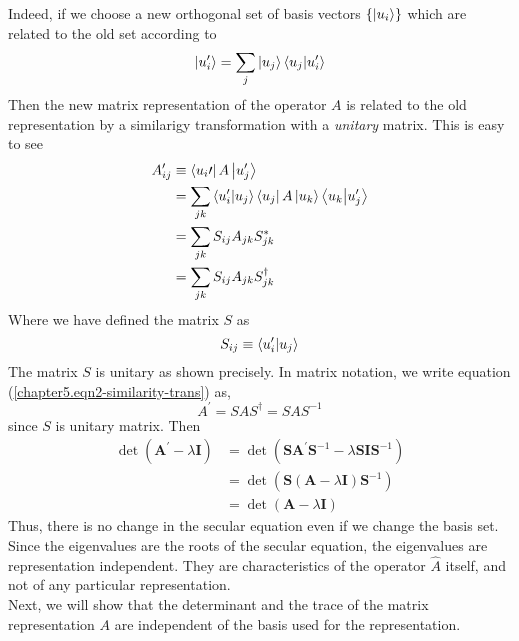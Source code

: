 	Indeed, if we choose a new orthogonal set of basis vectors $\{\ket{u_i}\}$ which are related to the old set according to 
	\begin{equation}
		\ket{u_i^\prime} = \sum_j \ket{u_j}\braket{u_j}{u_i^\prime}
	\end{equation}
	Then the new matrix representation of the operator $A$ is related to the old representation by a similarigy transformation with a \textit{unitary} matrix. This is easy to see
	\begin{eqnarray}
		A_{ij}^\prime 
		&\equiv \bra{u_i\prime} A \ket{u_j^\prime} \nonumber\\
		&= \sum_{jk} \braket{u_i^\prime}{u_j}\bra{u_j}A\ket{u_k}\braket{u_k}{u_j^\prime} \nonumber\\
		&= \sum_{jk} S_{ij} A_{jk} S_{jk}^* \nonumber\\
		&= \sum_{jk} S_{ij} A_{jk} S_{jk}^\dagger
		\label{chapter5.eqn2-similarity-trans}
	\end{eqnarray}
	Where we have defined the matrix $S$ as
	\begin{equation}
		S_{ij} \equiv \braket{u_i^\prime}{u_j}
	\end{equation}
	The matrix $S$ is unitary as shown precisely. In matrix notation, we write equation (\ref{chapter5.eqn2-similarity-trans}) as,
	\begin{equation}
		A^\prime = S A S^\dagger = S A S^{-1}
	\end{equation}
	since $S$ is unitary matrix. Then
	\begin{eqnarray}
		\det(\mathbf{A}^\prime - \lambda \mathbf{I}) 
		&= \det(\mathbf{S}\mathbf{A}^\prime \mathbf{S}^{-1} - \lambda \mathbf{S} \mathbf{I} \mathbf{S}^{-1}) \nonumber \\
		&= \det(\mathbf{S}(\mathbf{A} - \lambda \mathbf{I}) \mathbf{S}^{-1})\nonumber \\
		&= \det(\mathbf{A} - \lambda \mathbf{I})
	\end{eqnarray}
	Thus, there is no change in the secular equation even if we change the basis set. Since the eigenvalues are the roots of the secular equation, the eigenvalues are representation independent. They are characteristics of the operator $\hat{A}$ itself, and not of any particular representation.\\

	Next, we will show that the determinant and the trace of the matrix representation $A$ are independent of the basis used for the representation.\\
	
